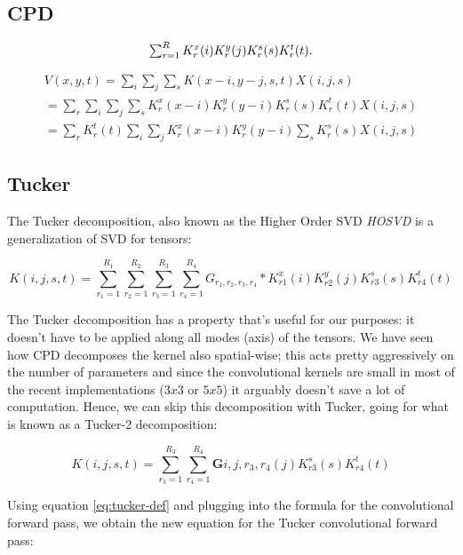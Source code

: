 \subsection{CPD}

\begin{equation}
$$ \sum_{r=1}^R K^x_r(i)K^y_r(j)K^s_r(s)K^t_r(t) $$.	
\end{equation}


\begin{center}
\begin{align*}
	V(x, y, t) = \sum_i \sum_j \sum_s K(x-i, y-j, s, t)X(i, j, s) \\
		= \sum_r \sum_i \sum_j \sum_s K^x_r(x-i)K^y_r(y-i)K^s_r(s)K^t_r(t)X(i, j, s)\\
			= \sum_r K^t_r(t) \sum_i \sum_j K^x_r(x-i)K^y_r(y-i) \sum_s K^s_r(s) X(i, j, s) \tag{4}
\end{align*}
\end{center}


\subsection{Tucker}
The Tucker decomposition, also known as the Higher Order SVD  \emph{HOSVD} is a generalization of SVD for tensors: 

$$ K(i, j, s, t) = \sum_{r_1=1}^{R_1}\sum_{r_2=1}^{R_2}\sum_{r_3=1}^{R_3}\sum_{r_4=1}^{R_4}G_{r_1, r_2, r_3, r_4} * K^x_{r1}(i)K^y_{r2}(j)K^s_{r3}(s)K^t_{r4}(t) $$

The Tucker decomposition has a property that's useful for our purposes: it doesn't have to be applied along all modes (axis) of the tensors. We have seen how CPD decomposes the kernel also spatial-wise; this acts
pretty aggressively on the number of parameters and since the convolutional kernels are small in most of the recent implementations ($3x3$ or $5x5$) it arguably doesn't save a lot of computation. Hence, we can skip
this decomposition with Tucker, going for what is known as a Tucker-2 decomposition: 

\begin{equation}
\label{eq:tucker-def}
	K(i, j, s, t) = \sum_{r_3=1}^{R_3}\sum_{r_4=1}^{R_4} \textbf{G} {i,j,r_3, r_4}(j)K^s_{r3}(s)K^t_{r4}(t) 
\end{equation} 

Using equation \ref{eq:tucker-def} and plugging into the formula for the convolutional forward pass, we obtain the new equation for the Tucker convolutional forward pass: 


